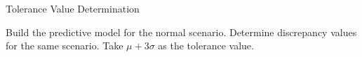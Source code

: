 \begin{frame}[allowframebreaks]{Tolerance Value Determination}
    \begin{algorithm}[H]
		\caption{Tolerance value determination}
        \begin{algorithmic}[1]
			\State Build the predictive model for the normal scenario.
            \State Determine discrepancy values for the same scenario.
            \State Take \(\mu + 3\sigma\) as the tolerance value.
        \end{algorithmic}
    \end{algorithm}
\end{frame}